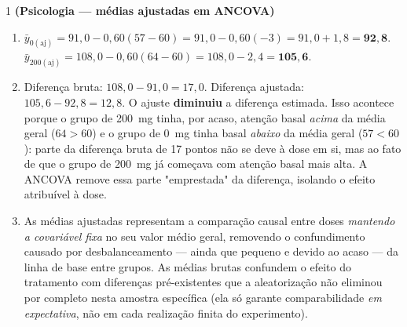 \documentclass[11pt]{article}
\begin{document}

\begin{questao}{1} \textbf{(Psicologia --- médias ajustadas em ANCOVA)}
\end{questao}
\begin{solucao}
\begin{enumerate}[label=(\alph*)]
  \item $\bar y_{0(\text{aj})} = 91{,}0 - 0{,}60(57-60) = 91{,}0 - 0{,}60(-3) = 91{,}0+1{,}8 =
    \mathbf{92{,}8}$.
    $\bar y_{200(\text{aj})} = 108{,}0 - 0{,}60(64-60) = 108{,}0-2{,}4 = \mathbf{105{,}6}$.
  \item Diferença bruta: $108{,}0-91{,}0=17{,}0$. Diferença ajustada: $105{,}6-92{,}8=12{,}8$. O
    ajuste \textbf{diminuiu} a diferença estimada. Isso acontece porque o grupo de 200~mg tinha,
    por acaso, atenção basal \emph{acima} da média geral ($64>60$) e o grupo de 0~mg tinha basal
    \emph{abaixo} da média geral ($57<60$): parte da diferença bruta de 17 pontos não se deve à
    dose em si, mas ao fato de que o grupo de 200~mg já começava com atenção basal mais alta. A
    ANCOVA remove essa parte "emprestada" da diferença, isolando o efeito atribuível à dose.
  \item As médias ajustadas representam a comparação causal entre doses \emph{mantendo a
    covariável fixa} no seu valor médio geral, removendo o confundimento causado por
    desbalanceamento --- ainda que pequeno e devido ao acaso --- da linha de base entre grupos.
    As médias brutas confundem o efeito do tratamento com diferenças pré-existentes que a
    aleatorização não eliminou por completo nesta amostra específica (ela só garante
    comparabilidade \emph{em expectativa}, não em cada realização finita do experimento).
\end{enumerate}
\end{solucao}
\end{document}
